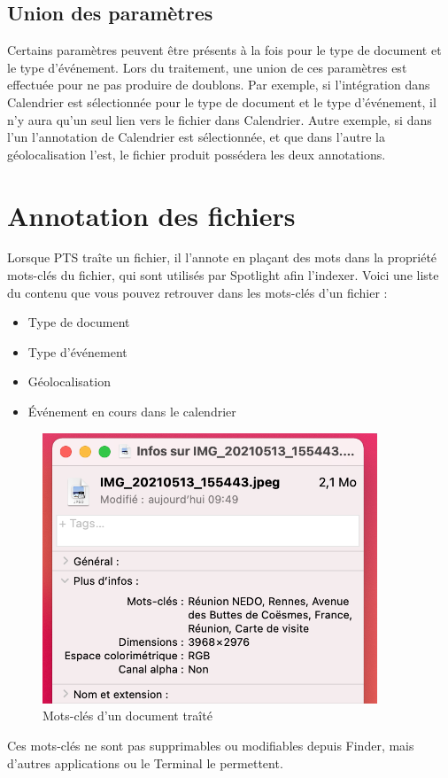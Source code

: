 \documentclass[a4paper,11pt]{article}
\begin{document}
	\subsection{Union des paramètres}
	Certains paramètres peuvent être présents à la fois pour le type de document et le type d'événement. Lors du traitement, une union de ces paramètres est effectuée pour ne pas produire de doublons. Par exemple, si l'intégration dans Calendrier est sélectionnée pour le type de document et le type d'événement, il n'y aura qu'un seul lien vers le fichier dans Calendrier. Autre exemple, si dans l'un l'annotation de Calendrier est sélectionnée, et que dans l'autre la géolocalisation l'est, le fichier produit possédera les deux annotations.


	\section{Annotation des fichiers}
	Lorsque PTS traîte un fichier, il l'annote en plaçant des mots dans la propriété mots-clés du fichier, qui sont utilisés par Spotlight afin l'indexer. Voici une liste du contenu que vous pouvez retrouver dans les mots-clés d'un fichier :
	\begin{itemize}
		\item Type de document
		\item Type d'événement
		\item Géolocalisation
		\item Événement en cours dans le calendrier
	\end{itemize}

	\begin{figure}[h!]
		\centering
		\includegraphics[width=10cm]{Mots-cles}
		\caption{Mots-clés d'un document traîté}
	\end{figure}

	Ces mots-clés ne sont pas supprimables ou modifiables depuis Finder, mais d'autres applications ou le Terminal le permettent.
\end{document}
